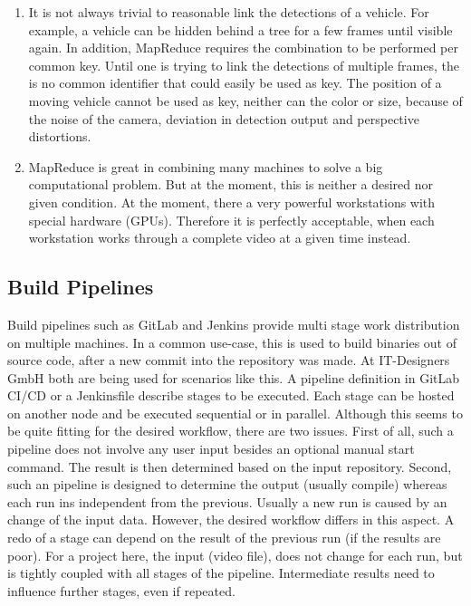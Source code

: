 \begin{enumerate}
	\item It is not always trivial to reasonable link the detections of a vehicle.
	For example, a vehicle can be hidden behind a tree for a few frames until visible again.
	In addition, MapReduce requires the combination to be performed per common key.
	Until one is trying to link the detections of multiple frames, the is no common identifier that could easily be used as key.
	The position of a moving vehicle cannot be used as key, neither can the color or size, because of the noise of the camera, deviation in detection output and perspective distortions.
	\item MapReduce is great in combining many machines to solve a big computational problem.
	But at the moment, this is neither a desired nor given condition. At the moment, there a  very powerful workstations with special hardware (GPUs).
	Therefore it is perfectly acceptable, when each workstation works through a complete video at a given time instead.
\end{enumerate}

\subsection{Build Pipelines}

Build pipelines such as GitLab\cite{gitlab:main} and Jenkins\cite{jenkins:main} provide multi stage work distribution on multiple machines.
In a common use-case, this is used to build binaries out of source code, after a new commit into the  repository was made.
At IT-Designers GmbH both are being used for scenarios like this.
A pipeline definition in GitLab CI/CD \cite{gitlab:ci:yaml} or a Jenkinsfile \cite{jenkins:pipeline:jenkinsfile} describe stages to be executed.
Each stage can be hosted on another node and be executed sequential or in parallel.
Although this seems to be quite fitting for the desired workflow, there are two issues.
First of all, such a pipeline does not involve any user input besides an optional manual start command.
The result is then determined based on the input repository.
Second, such an pipeline is designed to determine the output (usually compile) whereas each run ins independent from the previous.
Usually a new run is caused by an change of the input data.
However, the desired workflow differs in this aspect.
A redo of a stage can depend on the result of the previous run (if the results are poor).
For a project here, the input (video file), does not change for each run, but is tightly coupled with all stages of the pipeline.
Intermediate results need to influence further stages, even if repeated.

